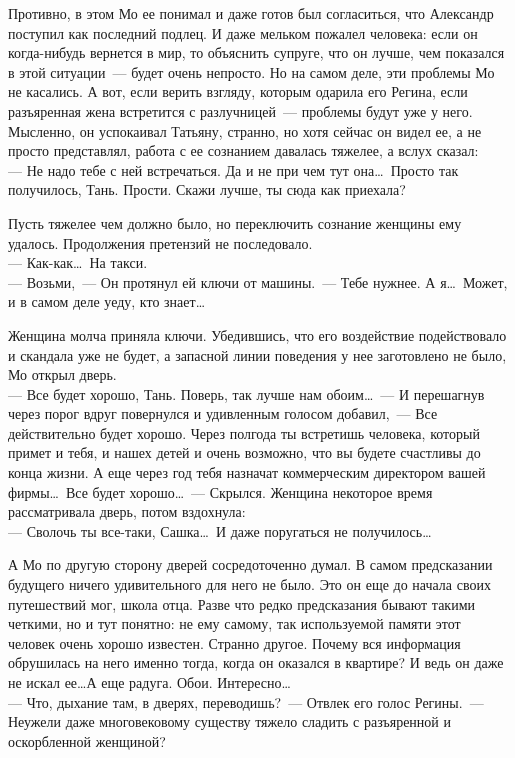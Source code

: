 Противно, в этом Мо ее понимал и даже готов был согласиться, что Александр 
поступил как последний подлец. И даже мельком пожалел человека: если он 
когда-нибудь вернется в мир, то объяснить супруге, что он лучше, чем показался 
в 
этой ситуации~--- будет очень непросто. Но на самом деле, эти проблемы Мо не 
касались. А вот, если верить взгляду, которым одарила его Регина, если 
разъяренная жена встретится с разлучницей~--- проблемы будут уже у него. 
Мысленно, он успокаивал Татьяну, странно, но хотя сейчас он видел ее, а не 
просто представлял, работа с ее сознанием давалась тяжелее, а вслух сказал:\\
--- Не надо тебе с ней встречаться. Да и не при чем тут она\ldots\ Просто 
так получилось, Тань. Прости. Скажи лучше, ты сюда как приехала?

Пусть тяжелее чем должно было, но переключить сознание женщины ему удалось. 
Продолжения претензий не последовало.\\
--- Как-как\ldots\ На такси.\\
--- Возьми,~--- Он протянул ей ключи от машины.~--- Тебе нужнее. А я\ldots\ 
Может, и в самом деле уеду, кто знает\ldots

Женщина молча приняла ключи. Убедившись, что его воздействие подействовало и 
скандала уже не будет, а запасной линии поведения у нее заготовлено не было, Мо 
открыл дверь.\\
--- Все будет хорошо, Тань. Поверь, так лучше нам обоим\ldots~--- И 
перешагнув через порог вдруг повернулся и удивленным голосом добавил,~--- Все 
действительно будет хорошо. Через полгода ты встретишь человека, который примет 
и тебя, и нашех детей и очень возможно, что вы будете счастливы до конца жизни. 
А еще через год тебя назначат коммерческим директором вашей фирмы\ldots\ Все 
будет хорошо\ldots~--- Скрылся. Женщина некоторое время рассматривала дверь, 
потом вздохнула:\\
--- Сволочь ты все-таки, Сашка\ldots\ И даже поругаться не получилось\ldots

А Мо по другую сторону дверей сосредоточенно думал. В самом предсказании 
будущего ничего удивительного для него не было. Это он еще до начала своих 
путешествий мог, школа отца. Разве что редко предсказания бывают такими 
четкими, 
но и тут понятно: не ему самому, так используемой памяти этот человек очень 
хорошо известен. Странно другое. Почему вся информация обрушилась на него 
именно 
тогда, когда он оказался в квартире? И ведь он даже не искал ее\ldots А еще 
радуга. Обои. Интересно\ldots\\
--- Что, дыхание там, в дверях, переводишь?~--- Отвлек его голос Регины.~--- 
Неужели даже многовековому существу тяжело сладить с разъяренной и оскорбленной 
женщиной?

